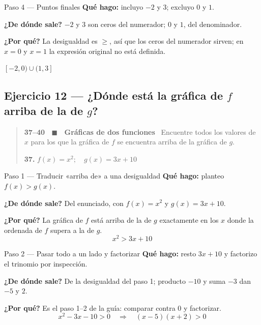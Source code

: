 \documentclass[11pt]{article}
\begin{document}
\begin{paso}{Paso 4 --- Puntos finales}
\textbf{Qué hago:} incluyo $-2$ y $3$; excluyo $0$ y $1$.

\textbf{¿De dónde sale?} $-2$ y $3$ son ceros del numerador; $0$ y $1$, del denominador.

\textbf{¿Por qué?} La desigualdad es $\ge$, así que los ceros del numerador sirven; en $x=0$ y $x=1$ la expresión original no está definida.
\end{paso}

\begin{resp}
$[-2,0)\cup(1,3]$
\end{resp}

\subsection*{Ejercicio 12 — ¿Dónde está la gráfica de $f$ arriba de la de $g$?}

\begin{quote}
\textbf{37--40 \ $\blacksquare$ \ Gráficas de dos funciones} \ Encuentre todos los valores de $x$ para los que la gráfica de $f$ se encuentra arriba de la gráfica de $g$.

\textbf{37.} $f(x)=x^2;\quad g(x)=3x+10$
\end{quote}

\begin{paso}{Paso 1 --- Traducir «arriba de» a una desigualdad}
\textbf{Qué hago:} planteo $f(x)>g(x)$.

\textbf{¿De dónde sale?} Del enunciado, con $f(x)=x^2$ y $g(x)=3x+10$.

\textbf{¿Por qué?} La gráfica de $f$ está arriba de la de $g$ exactamente en los $x$ donde la ordenada de $f$ supera a la de $g$.
\[
x^2>3x+10
\]
\end{paso}

\begin{paso}{Paso 2 --- Pasar todo a un lado y factorizar}
\textbf{Qué hago:} resto $3x+10$ y factorizo el trinomio por inspección.

\textbf{¿De dónde sale?} De la desigualdad del paso 1; producto $-10$ y suma $-3$ dan $-5$ y $2$.

\textbf{¿Por qué?} Es el paso 1--2 de la guía: comparar contra $0$ y factorizar.
\[
x^2-3x-10>0\quad\Longrightarrow\quad (x-5)(x+2)>0
\]
\end{paso}
\end{document}
